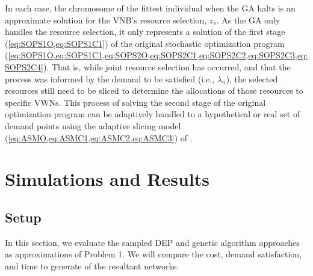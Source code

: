 \documentclass[12pt,dvipsnames]{report}
\begin{document}
In each case, the chromosome of the fittest individual when the GA halts is an approximate solution for the VNB's resource selection, $z_s$.  As the GA only handles the resource selection, it only represents a solution of the first stage (\cref{eq:SOPS1O,eq:SOPS1C1}) of the original stochastic optimization program (\cref{eq:SOPS1O,eq:SOPS1C1,eq:SOPS2O,eq:SOPS2C1,eq:SOPS2C2,eq:SOPS2C3,eq:SOPS2C4}).  That is, while joint resource selection has occurred, and that the process was informed by the demand to be satisfied (i.e., $\lambda_n$), the selected resources still need to be sliced to determine the allocations of those resources to specific VWNs.  This process of solving the second stage of the original optimization program can be adaptively handled to a hypothetical or real set of demand points using the adaptive slicing model (\cref{eq:ASMO,eq:ASMC1,eq:ASMC2,eq:ASMC3}) of .
\fi

\iftrue
\pagebreak
\chapter{Simulations and Results} \label{ch:sim}

\section{Setup} \label{sec:simsetup}

In this section, we evaluate the sampled DEP and genetic algorithm approaches as approximations of Problem 1.  We will compare the cost, demand satisfaction, and time to generate of the resultant networks.
\end{document}
